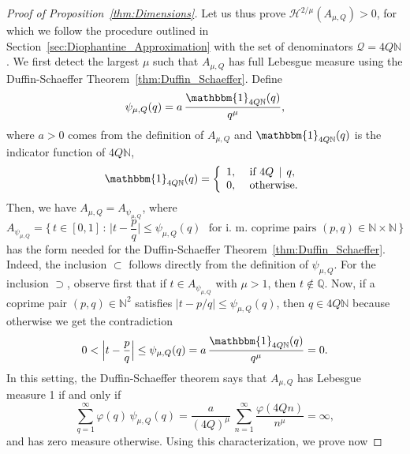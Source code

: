 \documentclass[11pt,reqno]{amsart}
\theoremstyle{definition}
\begin{document}
\begin{proof}[Proof of Proposition~\ref{thm:Dimensions}]
Let us thus prove 
$\mathcal H^{2/\mu}( A_{\mu,Q}) > 0$, 
for which we follow the procedure outlined in Section~\ref{sec:Diophantine_Approximation} with the set of denominators $\mathcal Q = 4Q\mathbb N$. 
We first detect the largest $\mu$ such that $A_{\mu,Q}$
has full Lebesgue measure
using the Duffin-Schaeffer Theorem~\ref{thm:Duffin_Schaeffer}. 
Define
\begin{equation}
\psi_{\mu,Q}(q) = a\, \frac{ \mathbbm{1}_{ 4Q \mathbb N}(q)}{q^{\mu}}, 
\end{equation}
where $a> 0$ comes from the definition of $A_{\mu,Q}$ and 
$\mathbbm{1}_{ 4Q \mathbb N}(q)$ is the indicator function of $4Q\mathbb N$,
\begin{equation}
\mathbbm{1}_{ 4Q \mathbb N}(q) = 
\left\{ 
\begin{array}{ll}
1, & \text{ if } 4 Q \, \mid \, q, \\
0, & \text{ otherwise.}
\end{array}
\right.
\end{equation}
Then, we have $A_{\mu,Q} = A_{\psi_{\mu,Q}}$, where
\begin{equation}\label{eq:A_with_Psi}
A_{\psi_{\mu,Q}}
= \Big\{ \, t \in [0,1]  \, : \,   \Big| t - \frac{p}{q} \Big| \leq \psi_{\mu,Q}(q) \, \, \text{ for i. m. coprime pairs }  (p,q) \in  \mathbb N \times \mathbb N  \,  \Big\}
\end{equation}
has the form needed for the Duffin-Schaeffer Theorem~\ref{thm:Duffin_Schaeffer}. 
Indeed, the inclusion $\subset$ follows directly from the definition of $\psi_{\mu,Q}$. 
For the inclusion $\supset$, observe first that if $t \in A_{\psi_{\mu,Q}}$ with $\mu > 1$, then $t \not\in \mathbb Q$. 
Now, if a coprime pair $(p,q) \in \mathbb N^2$ satisfies $|t - p/q| \leq \psi_{\mu,Q}(q)$, then $q \in 4Q\mathbb N$ because otherwise we get the contradiction
\begin{equation}
0 < \Big| t - \frac{p}{q} \Big| \leq \psi_{\mu,Q}(q) = a \, \frac{\mathbbm{1}_{4Q\mathbb N}(q)}{q^\mu} = 0.
\end{equation}
In this setting, the Duffin-Schaeffer theorem says that 
$A_{\mu,Q}$ has Lebesgue measure 1  if and only if 
\begin{equation}\label{eq:The_Sum}
\sum_{q=1}^\infty \varphi(q) \,  \psi_{\mu,Q}(q) 
= \frac{a}{(4Q)^\mu} \, \sum_{n=1}^\infty \frac{\varphi(4Qn)}{ n^\mu } 
= \infty, 
\end{equation}
and has zero measure otherwise. 
Using this characterization, we prove now 

\end{proof}
\end{document}
